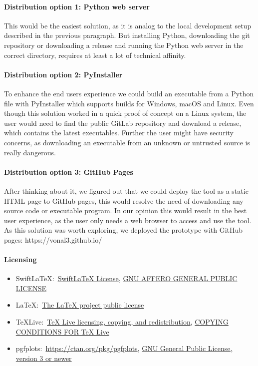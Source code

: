 \paragraph{Distribution option 1: Python web server}
This would be the easiest solution, as it is analog to the local development setup described in the previous paragraph.
But installing Python, downloading the git repository or downloading a release and running the Python web server in the correct directory, requires at least a lot of technical affinity.

\paragraph{Distribution option 2: PyInstaller}
To enhance the end users experience we could build an executable from a Python file with PyInstaller which supports builds for Windows, macOS and Linux.
Even though this solution worked in a quick proof of concept on a Linux system, the user would need to find the public GitLab repository and download a release, which contains the latest executables.
Further the user might have security concerns, as downloading an executable from an unknown or untrusted source is really dangerous.

\paragraph{Distribution option 3: GitHub Pages}
After thinking about it, we figured out that we could deploy the tool as a static HTML page to GitHub pages, this would resolve the need of downloading any source code or executable program.
In our opinion this would result in the best user experience, as the user only needs a web browser to access and use the tool.
As this solution was worth exploring, we deployed the prototype with GitHub pages: https://vonal3.github.io/

\paragraph{Licensing}
\begin{itemize}
    \item SwiftLaTeX:\ \href{https://github.com/SwiftLaTeX/SwiftLaTeX/blob/master/LICENSE}{SwiftLaTeX License}, \href{https://www.gnu.org/licenses/agpl-3.0.en.html}{GNU AFFERO GENERAL PUBLIC LICENSE}
    \item LaTeX:\ \href{https://www.latex-project.org/lppl.txt}{The LaTeX project public license}
    \item TeXLive:\ \href{https://www.tug.org/texlive/copying.html}{TeX Live licensing, copying, and redistribution}, \href{https://www.tug.org/texlive/LICENSE.TL}{COPYING CONDITIONS FOR TeX Live}
    \item pgfplots:\ \href{https://ctan.org/pkg/pgfplots}{https://ctan.org/pkg/pgfplots}, \href{https://www.gnu.org/licenses/gpl-3.0.en.html}{GNU General Public License, version 3 or newer}
\end{itemize}

